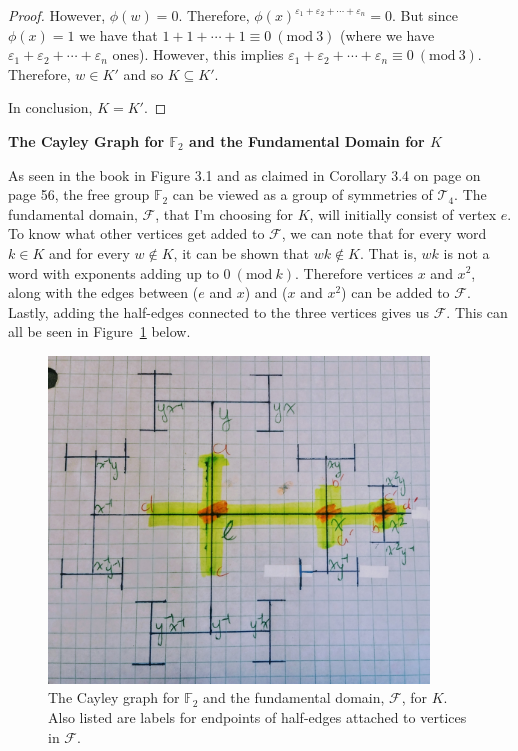 \documentclass[12pt]{article}%
\newcommand{\F}{\mathbb{F}}
\newcommand{\Mod}[1]{\ (\mathrm{mod}\ #1)}
\begin{document}
\begin{proof}
However, $\phi(w)=0$. Therefore, $\phi(x)^{\varepsilon_1+\varepsilon_2+\cdots +\varepsilon_n}=0$. But
since $\phi(x)=1$ we have that $1+1+\cdots+1\equiv 0\Mod3$ (where we have
$\varepsilon_1+\varepsilon_2+\cdots +\varepsilon_n$ ones). However, this implies
$\varepsilon_1+\varepsilon_2+\cdots +\varepsilon_n \equiv 0 \Mod{3}$. Therefore, $w\in K'$ and so
$K\subseteq K'$.

In conclusion, $K=K'$.

\end{proof}

\textbf{The Cayley Graph for $\F_2$ and the Fundamental Domain for $K$}

As seen in the book in Figure 3.1 and as claimed in Corollary 3.4 on page on page 56, the free group
$\F_2$ can be viewed as a group of symmetries of $\mathcal{T}_4$. The fundamental domain, $\mathcal{F}$,
that I'm choosing for $K$, will initially consist of vertex $e$. To know what other vertices get added to
$\mathcal{F}$, we can note that for every word $k\in K$ and for every $w\not\in K$, it can be shown that
$wk\not\in K$. That is, $wk$ is not a word with exponents adding up to $0\Mod{k}$. Therefore vertices $x$
and $x^2$, along with the edges between ($e$ and $x$) and ($x$ and $x^2$) can be added to $\mathcal{F}$.
Lastly, adding the half-edges connected to the three vertices gives us $\mathcal{F}$. This can all be seen
in Figure~\ref{fig:fun_domain_of_K} below.

\begin{figure}[ht]
    \centering
    \includegraphics[width=0.9\textwidth]{images/fundamental_domain_for_K.jpg}
    \caption{The Cayley graph for $\F_2$ and the fundamental domain, $\mathcal{F}$, for $K$. Also listed are labels for endpoints of half-edges attached to vertices in $\mathcal{F}$.}
    \label{fig:fun_domain_of_K}
\end{figure}
\end{document}
